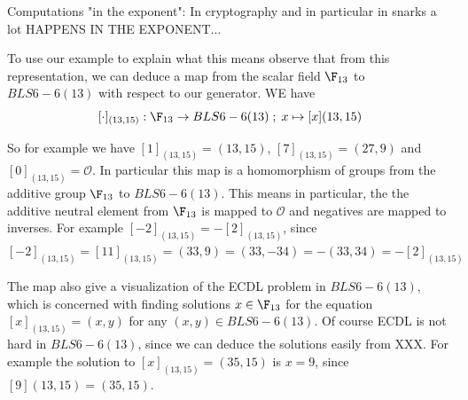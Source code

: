 Computations "in the exponent": In cryptography and in particular in snarks a lot HAPPENS IN THE EXPONENT...

To use our example to explain what this means observe that from this representation, we can deduce a map from the scalar field $\F_{13}$ to $BLS6-6(13)$ with respect to our generator. WE have
$$
[\cdot]_{(13,15)}: \F_{13} \to BLS6-6(13)\;;\; x \mapsto [x](13,15)
$$

So for example we have $[1]_{(13,15)}= (13,15)$, $[7]_{(13,15)}= (27,9)$ and $[0]_{(13,15)}= \mathcal{O}$. In particular this map is a homomorphism of groups from the additive group $\F_{13}$ to $BLS6-6(13)$. This means in particular, the the additive neutral element from $\F_{13}$ is mapped to $\mathcal{O}$ and negatives are mapped to inverses. For example $[-2]_{(13,15)}= - [2]_{(13,15)}$, since
$[-2]_{(13,15)}= [11]_{(13,15)}= (33,9) = (33,-34) = -(33,34)=
- [2]_{(13,15)}$

The map also give a visualization of the ECDL problem in $BLS6-6(13)$, which is concerned with finding solutions $x\in \F_{13}$ for the equation 
$[x]_{(13,15)}= (x,y)$ for any $(x,y) \in BLS6-6(13)$. Of course ECDL is not hard in $BLS6-6(13)$, since we can deduce the solutions easily from XXX. For example the solution to $[x]_{(13,15)}= (35,15)$ is $x=9$, since $[9](13,15)=(35,15)$.

